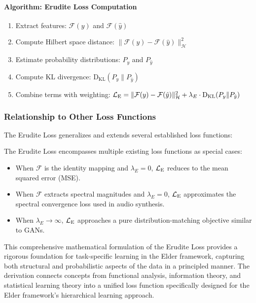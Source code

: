 \paragraph{Algorithm: Erudite Loss Computation}
\begin{enumerate}
\item Extract features: $\mathcal{F}(y)$ and $\mathcal{F}(\hat{y})$
\item Compute Hilbert space distance: $\|\mathcal{F}(y) - \mathcal{F}(\hat{y})\|_{\mathcal{H}}^2$
\item Estimate probability distributions: $P_y$ and $P_{\hat{y}}$
\item Compute KL divergence: $\mathrm{D_{KL}}(P_y \| P_{\hat{y}})$
\item Combine terms with weighting: $\mathcal{L}_{\text{E}} = \|\mathcal{F}(y) - \mathcal{F}(\hat{y})\|_{\mathcal{H}}^2 + \lambda_E \cdot \mathrm{D_{KL}}(P_y \| P_{\hat{y}})$
\end{enumerate}

\subsubsection{Relationship to Other Loss Functions}

The Erudite Loss generalizes and extends several established loss functions:

\begin{proposition}
The Erudite Loss encompasses multiple existing loss functions as special cases:
\begin{itemize}
\item When $\mathcal{F}$ is the identity mapping and $\lambda_E = 0$, $\mathcal{L}_{\text{E}}$ reduces to the mean squared error (MSE).
\item When $\mathcal{F}$ extracts spectral magnitudes and $\lambda_E = 0$, $\mathcal{L}_{\text{E}}$ approximates the spectral convergence loss used in audio synthesis.
\item When $\lambda_E \to \infty$, $\mathcal{L}_{\text{E}}$ approaches a pure distribution-matching objective similar to GANs.
\end{itemize}
\end{proposition}

This comprehensive mathematical formulation of the Erudite Loss provides a rigorous foundation for task-specific learning in the Elder framework, capturing both structural and probabilistic aspects of the data in a principled manner. The derivation connects concepts from functional analysis, information theory, and statistical learning theory into a unified loss function specifically designed for the Elder framework's hierarchical learning approach.